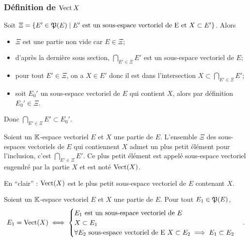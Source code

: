 \subsubsection{Définition de \(\operatorname{Vect}{X}\)}

Soit \(\Xi=\left\{E' \in \mathfrak{P}(E)\mathrel{}\middle|\mathrel{}E' \text{~est un sous-espace vectoriel de E
et } X \subset E'\right\}\). Alors
\begin{itemize}
  \item \(\Xi\) est une partie non vide car \(E \in \Xi\);
  \item d'après la dernière sous section, \(\bigcap_{E' \in \Xi} E'\) est un
    sous-espace vectoriel de \(E\);
  \item pour tout \(E' \in \Xi\), on a \(X \in E'\) donc il est dans
    l'intersection \(X \subset \bigcap_{E' \in \Xi} E'\);
  \item soit \(E_0'\) un sous-espace vectoriel de \(E\) qui contient \(X\),
    alors par définition \(E_0' \in \Xi\).
\end{itemize}

Donc \(\bigcap_{E' \in \Xi} E' \subset E_0'\).

\begin{defdef}
  Soient un \(\mathbb{K}\)-espace vectoriel \(E\) et \(X\) une partie de \(E\).
  L'ensemble \(\Xi\) des sous-espaces vectoriels de \(E\) qui contiennent \(X\)
  admet un plus petit élément pour l'inclusion, c'est \(\bigcap_{E' \in \Xi}
  E'\). Ce plus petit élément est appelé sous-espace vectoriel engendré par la
  partie \(X\) et est noté \(\operatorname{Vect}(X)\).

  En ``clair'' : \(\operatorname{Vect}(X)\) est le plus petit sous-espace vectoriel de
  \(E\) contenant \(X\).
\end{defdef}

\begin{prop}
  Soient un \(\mathbb{K}\)-espace vectoriel \(E\) et \(X\) une partie de \(E\). Pour
  tout \(E_1 \in \mathfrak{P}(E)\),
  \begin{equation}
    E_1 = \operatorname{Vect}(X) \iff
    \begin{cases}
      E_1 \text{~est un sous-espace vectoriel de } E \\
      X \subset E_1 \\
      \forall E_2 \text{~sous-espace vectoriel de E } X \subset E_2 \implies E_1
      \subset E_2
    \end{cases}.
  \end{equation}
\end{prop}

